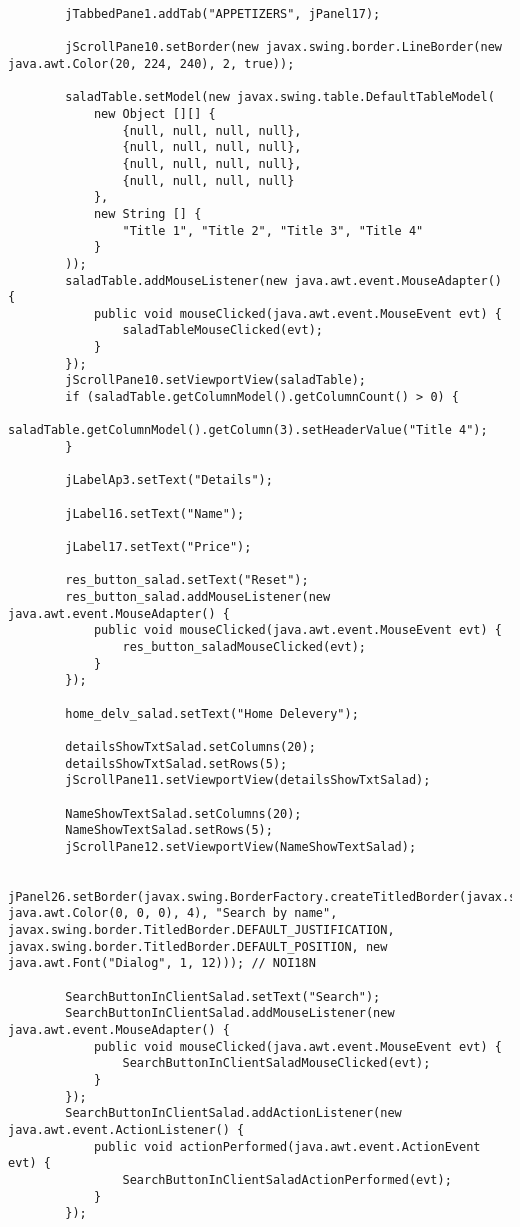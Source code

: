 \documentclass[12pt,a4paper]{article}
\begin{document}
\begin{lstlisting}
        jTabbedPane1.addTab("APPETIZERS", jPanel17);

        jScrollPane10.setBorder(new javax.swing.border.LineBorder(new java.awt.Color(20, 224, 240), 2, true));

        saladTable.setModel(new javax.swing.table.DefaultTableModel(
            new Object [][] {
                {null, null, null, null},
                {null, null, null, null},
                {null, null, null, null},
                {null, null, null, null}
            },
            new String [] {
                "Title 1", "Title 2", "Title 3", "Title 4"
            }
        ));
        saladTable.addMouseListener(new java.awt.event.MouseAdapter() {
            public void mouseClicked(java.awt.event.MouseEvent evt) {
                saladTableMouseClicked(evt);
            }
        });
        jScrollPane10.setViewportView(saladTable);
        if (saladTable.getColumnModel().getColumnCount() > 0) {
            saladTable.getColumnModel().getColumn(3).setHeaderValue("Title 4");
        }

        jLabelAp3.setText("Details");

        jLabel16.setText("Name");

        jLabel17.setText("Price");

        res_button_salad.setText("Reset");
        res_button_salad.addMouseListener(new java.awt.event.MouseAdapter() {
            public void mouseClicked(java.awt.event.MouseEvent evt) {
                res_button_saladMouseClicked(evt);
            }
        });

        home_delv_salad.setText("Home Delevery");

        detailsShowTxtSalad.setColumns(20);
        detailsShowTxtSalad.setRows(5);
        jScrollPane11.setViewportView(detailsShowTxtSalad);

        NameShowTextSalad.setColumns(20);
        NameShowTextSalad.setRows(5);
        jScrollPane12.setViewportView(NameShowTextSalad);

        jPanel26.setBorder(javax.swing.BorderFactory.createTitledBorder(javax.swing.BorderFactory.createLineBorder(new java.awt.Color(0, 0, 0), 4), "Search by name", javax.swing.border.TitledBorder.DEFAULT_JUSTIFICATION, javax.swing.border.TitledBorder.DEFAULT_POSITION, new java.awt.Font("Dialog", 1, 12))); // NOI18N

        SearchButtonInClientSalad.setText("Search");
        SearchButtonInClientSalad.addMouseListener(new java.awt.event.MouseAdapter() {
            public void mouseClicked(java.awt.event.MouseEvent evt) {
                SearchButtonInClientSaladMouseClicked(evt);
            }
        });
        SearchButtonInClientSalad.addActionListener(new java.awt.event.ActionListener() {
            public void actionPerformed(java.awt.event.ActionEvent evt) {
                SearchButtonInClientSaladActionPerformed(evt);
            }
        });


\end{lstlisting}
\end{document}
